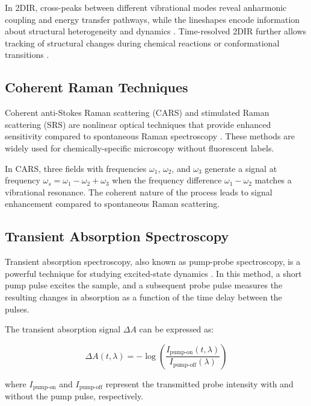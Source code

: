 \noindent In 2DIR, cross-peaks between different vibrational modes reveal anharmonic coupling and energy transfer pathways, while the lineshapes encode information about structural heterogeneity and dynamics \cite{Khalil2003}. Time-resolved 2DIR further allows tracking of structural changes during chemical reactions or conformational transitions \cite{Fayer2009}.

\subsection{Coherent Raman Techniques}
\label{subsec:coherent_raman}

\noindent Coherent anti-Stokes Raman scattering (CARS) and stimulated Raman scattering (SRS) are nonlinear optical techniques that provide enhanced sensitivity compared to spontaneous Raman spectroscopy \cite{Boyd2008}. These methods are widely used for chemically-specific microscopy without fluorescent labels.

\noindent In CARS, three fields with frequencies $\omega_1$, $\omega_2$, and $\omega_3$ generate a signal at frequency $\omega_s = \omega_1 - \omega_2 + \omega_3$ when the frequency difference $\omega_1 - \omega_2$ matches a vibrational resonance. The coherent nature of the process leads to signal enhancement compared to spontaneous Raman scattering.

\subsection{Transient Absorption Spectroscopy}
\label{subsec:transient_absorption}

\noindent Transient absorption spectroscopy, also known as pump-probe spectroscopy, is a powerful technique for studying excited-state dynamics \cite{Shim2006}. In this method, a short pump pulse excites the sample, and a subsequent probe pulse measures the resulting changes in absorption as a function of the time delay between the pulses.

\noindent The transient absorption signal $\Delta A$ can be expressed as:

\begin{equation}
    \Delta A(t, \lambda) = -\log\left(\frac{I_{\text{pump-on}}(t, \lambda)}{I_{\text{pump-off}}(\lambda)}\right)
    \label{eq:transient_absorption}
\end{equation}

\noindent where $I_{\text{pump-on}}$ and $I_{\text{pump-off}}$ represent the transmitted probe intensity with and without the pump pulse, respectively.

